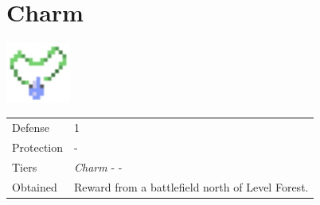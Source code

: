 \section{Charm}
\label{armor:charm}

\includegraphics[height=2cm,keepaspectratio]{./resources/armors/charm}

\begin{longtable}{ l p{9cm} }
	Defense
	& 1
\\ %
	Protection
	& -
\\ %
	Tiers
	& \textit{Charm} - \nameref{armor:magic_ring} - \nameref{armor:cupid_locket}
\\ %
	Obtained
	& Reward from a battlefield north of Level Forest.
\end{longtable}

